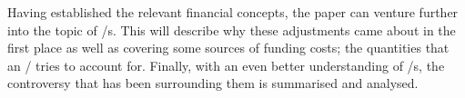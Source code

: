 \documentclass[main.tex]{subfiles}
\begin{document}
    Having established the relevant financial concepts, 
    the paper can venture further into the topic of \FVA/s.
    This  will describe why these adjustments came about in the first place
    as well as covering some sources of funding costs; 
    the quantities that an \FVA/ tries to account for.
    Finally, with an even better understanding of \FVA/s, 
    the controversy that has been surrounding them is summarised and analysed. 
    
\end{document}
